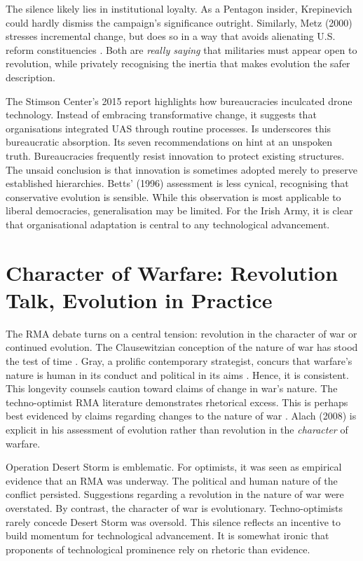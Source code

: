 The silence likely lies in institutional loyalty. As a Pentagon insider, Krepinevich could hardly dismiss the campaign’s significance outright. Similarly, Metz (2000) stresses incremental change, but does so in a way that avoids alienating U.S. reform constituencies \parencite{METZ_2000}. Both are \textit{really saying} that militaries must appear open to revolution, while privately recognising the inertia that makes evolution the safer description.


The Stimson Center's 2015 report highlights how bureaucracies inculcated drone technology. Instead of embracing transformative change, it suggests that organisations integrated UAS through routine processes. Is underscores this bureaucratic absorption. Its seven recommendations on \parencite[p.~9]{STIMSON_2015} hint at an unspoken truth. Bureaucracies frequently resist innovation to protect existing structures. The unsaid conclusion is that innovation is sometimes adopted merely to preserve established hierarchies. Betts' (1996) assessment is less cynical, recognising that conservative evolution is sensible. While this observation is most applicable to liberal democracies, generalisation may be limited. For the Irish Army, it is clear that organisational adaptation is central to any technological advancement.


\section{Character of Warfare: Revolution Talk, Evolution in Practice}
The RMA debate turns on a central tension: revolution in the character of war or continued evolution. The Clausewitzian conception of the nature of war has stood the test of time \parencite{CLAUSEWITZ_1984}. Gray, a prolific contemporary strategist, concurs that warfare's nature is human in its conduct and political in its aims \parencite{GRAY_2018}. Hence, it is consistent. This longevity counsels caution toward claims of change in war's nature. The techno-optimist RMA literature demonstrates rhetorical excess. This is perhaps best evidenced by claims regarding changes to the nature of war \textcite{HUNDLEY_1999,KREPINEVICH_1992,JORD_2003}. Alach (2008) is explicit in his assessment of evolution rather than revolution in the \textit{character} of warfare.

Operation Desert Storm is emblematic. For optimists, it was seen as empirical evidence that an RMA was underway. The political and human nature of the conflict persisted. Suggestions regarding a revolution in the nature of war were overstated. By contrast, the character of war is evolutionary. Techno-optimists rarely concede Desert Storm was oversold. This silence reflects an incentive to build momentum for technological advancement. It is somewhat ironic that proponents of technological prominence rely on rhetoric than evidence. 

